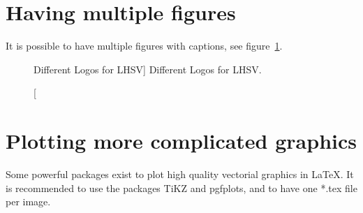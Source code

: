 \section{Having multiple figures}

It is possible to have multiple figures with captions, see figure~\ref{fig:ExampleMultipleImages}.

\begin{figure}[H]%
\begin{center}
%
\hfil
%
%
\hfil
%
%
\hfil
\mbox{}
\end{center}
\caption
[Different Logos for LHSV]
{Different Logos for LHSV.}
\label{fig:ExampleMultipleImages}
\end{figure}

\section{Plotting more complicated graphics}

Some powerful packages exist to plot high quality vectorial graphics in LaTeX. It is recommended to use the packages TiKZ and pgfplots, and to have
one *.tex file per image.